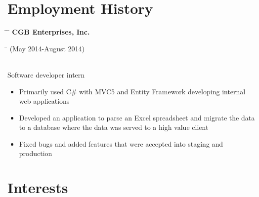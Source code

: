 \documentclass[10pt]{article} %
\begin{document}

\section{Employment History}
\vspace{-6mm}

\parbox{0.5\textwidth}{ %
\begin{tabbing} 
\hspace{2cm} \= \hspace{3cm} \= \kill 
\textbf{CGB Enterprises, Inc.}
\end{tabbing}}
\hfill 
\parbox{0.5\textwidth}{ %
\begin{tabbing} 
\hspace{5cm} \= \kill 
(May 2014-August 2014)
\end{tabbing}}
\vspace{-3mm}
\\Software developer intern
\vspace{-2mm}
\begin{itemize}
\item Primarily used C\# with MVC5 and Entity Framework developing internal web applications
\vspace{-3mm}
\item Developed an application to parse an Excel spreadsheet and migrate the data to a database where the data was served to a high value client
\vspace{-3mm}
\item Fixed bugs and added features that were accepted into staging and production
\vspace{-3mm}
\end{itemize}


\section{Interests}
\vspace{-3mm}

\end{document}
